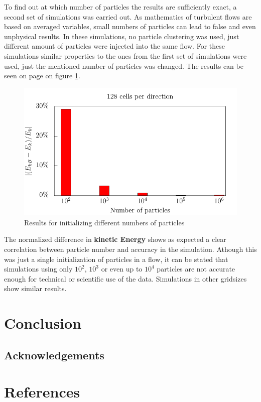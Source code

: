 \documentclass[a4paper,12pt]{article}
\numberwithin{equation}{section} %
\begin{document}
\newline
To find out at which number of particles the results are sufficiently exact, a second set of simulations was carried out. As mathematics of turbulent flows are based on averaged variables, small numbers of particles can lead to false and even unphysical results. In these simulations, no particle clustering was used, just different amount of particles were injected into the same flow. For these simulations similar properties to the ones from the first set of simulations were used, just the mentioned number of particles was changed. The results can be seen on page \pageref{kineticEnergy_numberOfParticles} on figure \ref{kineticEnergy_numberOfParticles}. 
\begin{figure}[h]
	\centering
  \includegraphics[width=\textwidth]{./../Simulationsergebnisse/variationPartikelAnzahl/128/kineticEnergy_numberOfParticles.pdf}
	\caption{Results for initializing different numbers of particles}
	\label{kineticEnergy_numberOfParticles}
\end{figure}
The normalized difference in \textbf{kinetic Energy} shows as expected a clear correlation between particle number and accuracy in the simulation. Athough this was just a single initialization of particles in a flow, it can be stated that simulations using only $10^2$, $10^3$ or even up to $10^4$ particles are not accurate enough for technical or scientific use of the data. Simulations in other gridsizes show similar results.
\pagebreak
\section{Conclusion}
\subsection*{Acknowledgements}
\pagebreak
\section{References}
\nocite{*} %
\pagebreak
\end{document}
